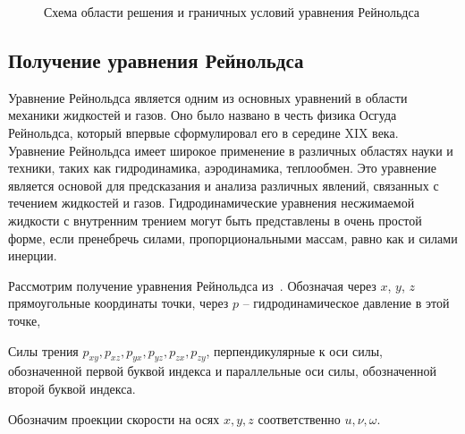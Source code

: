 \documentclass[a4paper,14pt]{extarticle}
\begin{document}
\begin{figure}[!htbp]
	\caption{Схема области решения и граничных условий уравнения Рейнольдса}
	\label{obl_resh}
\end{figure}

\subsection{Получение уравнения Рейнольдса}

Уравнение Рейнольдса является одним из основных уравнений в области механики жидкостей и газов. Оно было названо в честь физика Осгуда Рейнольдса, который впервые сформулировал его в середине XIX века.
Уравнение Рейнольдса имеет широкое применение в различных областях науки и техники, таких как гидродинамика, аэродинамика, теплообмен. Это уравнение является основой для предсказания и анализа различных явлений, связанных с течением жидкостей и газов.
Гидродинамические уравнения несжимаемой жидкости с
внутренним трением могут быть представлены в очень простой
форме, если пренебречь силами, пропорциональными массам,
равно как и силами инерции.

Рассмотрим получение уравнения Рейнольдса из~\cite{petrov_smazka}. Обозначая через $x$, $y$, $z$ прямоугольные координаты точки, через $p$ -- гидродинамическое давление в этой точке,

Силы трения $p_{xy}, p_{xz}, p_{yx}, p_{yz}, p_{zx}, p_{zy}$, перпендикулярные к оси силы, обозначенной первой буквой индекса и параллельные оси силы, обозначенной второй буквой индекса.

Обозначим проекции скорости на осях $x, y, z \text{ соответственно}$ $u, \nu, \omega$.
\end{document}
